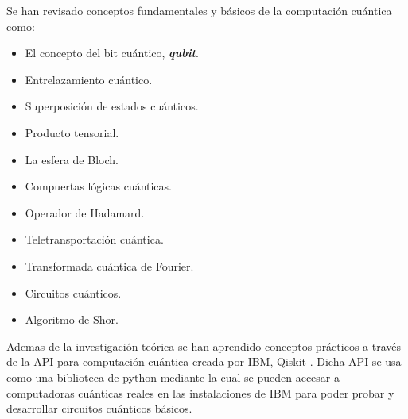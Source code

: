 \documentclass[a4paper]{article}
\begin{document}
Se han revisado conceptos fundamentales y básicos de la computación cuántica como:
\begin{itemize}
\item El concepto del bit cuántico, \textbf{\textit{qubit}}.
\item Entrelazamiento cuántico.
\item Superposición de estados cuánticos.
\item Producto tensorial.
\item La esfera de Bloch.
\item Compuertas lógicas cuánticas.
\item Operador de Hadamard.
\item Teletransportación cuántica.
\item Transformada cuántica de Fourier.
\item Circuitos cuánticos.
\item Algoritmo de Shor.

\end{itemize} 
Ademas de la investigación teórica se han aprendido conceptos prácticos a través de la API para computación cuántica creada por IBM, Qiskit \cite{Qiskit}. Dicha API se usa como una biblioteca de python mediante la cual se pueden accesar a computadoras cuánticas reales en las instalaciones de IBM para poder probar y desarrollar circuitos cuánticos básicos. 
\end{document}
